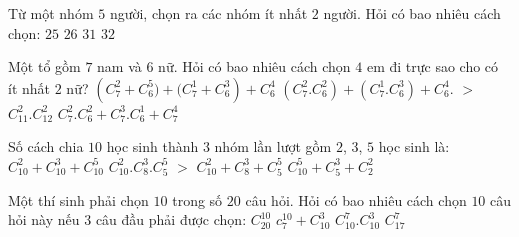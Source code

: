\begin{ex}
	Từ một nhóm $5$ người, chọn ra các nhóm ít nhất $2$ người. Hỏi có bao nhiêu cách chọn:
	\choice
	{$25$}
	{\True $26$}
	{$31$}
	{$32$}
\end{ex}

\begin{ex}
	Một tổ gồm $7$ nam và $6$ nữ. Hỏi có bao nhiêu cách chọn $4$ em đi trực sao cho có ít nhất $2$ nữ?
	\choice
	{$\left( {C_7^2 + C_6^5) + (C_7^1 + C_6^3} \right) + C_6^4$}
		{\True $\left( {C_7^2.C_6^2} \right) + \left( {C_7^1.C_6^3} \right) + C_6^4$. $>$}
		{$C_{11}^2.C_{12}^2$}
		{$C_7^2.C_6^2 + C_7^3.C_6^1 + C_7^4$}
\end{ex}

\begin{ex}
	Số cách chia $10$ học sinh thành $3$ nhóm lần lượt gồm $2$, $3$, $5$ học sinh là:
	\choice
	{$C_{10}^2 + C_{10}^3 + C_{10}^5$}
	{\True $C_{10}^2.C_8^3.C_5^5$ $>$}
	{$C_{10}^2 + C_8^3 + C_5^5$}
	{$C_{10}^5 + C_5^3 + C_2^2$}
\end{ex}

\begin{ex}
	Một thí sinh phải chọn $10$ trong số $20$ câu hỏi. Hỏi có bao nhiêu cách chọn $10$ câu hỏi này nếu $3$ câu đầu phải được chọn:
	\choice
	{$C_{20}^{10}$}
	{$c_7^{10} + C_{10}^3$}
	{$C_{10}^7.C_{10}^3$}
	{\True $C_{17}^7$}
\end{ex}

